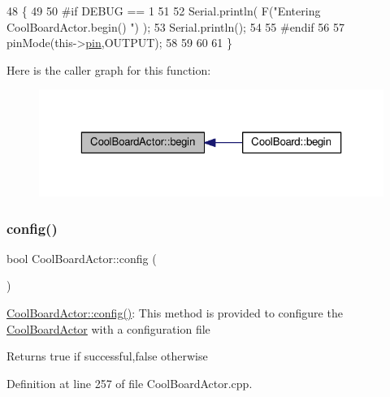 \begin{DoxyCode}
48 \{
49 
50 \textcolor{preprocessor}{#if DEBUG == 1 }
51  
52     Serial.println( F(\textcolor{stringliteral}{"Entering CoolBoardActor.begin() "}) );
53     Serial.println();
54 
55 \textcolor{preprocessor}{#endif}
56 
57     pinMode(this->\hyperlink{class_cool_board_actor_a8b5c0b41fe6033b68d9e1ed00bc2e122}{pin},OUTPUT);
58     
59     
60 
61 \}
\end{DoxyCode}
Here is the caller graph for this function\+:\nopagebreak
\begin{figure}[H]
\begin{center}
\leavevmode
\includegraphics[width=323pt]{dc/d69/class_cool_board_actor_a7f4422fd85a5510bc2cdfd68e109be5e_icgraph}
\end{center}
\end{figure}
\mbox{\label{class_cool_board_actor_a5af5538fc7d169f63127e06d5219bcd4}} 
\subsubsection{\texorpdfstring{config()}{config()}}
{\footnotesize\ttfamily bool Cool\+Board\+Actor\+::config (\begin{DoxyParamCaption}{ }\end{DoxyParamCaption})}

\hyperlink{class_cool_board_actor_a5af5538fc7d169f63127e06d5219bcd4}{Cool\+Board\+Actor\+::config()}\+: This method is provided to configure the \hyperlink{class_cool_board_actor}{Cool\+Board\+Actor} with a configuration file

\begin{DoxyReturn}{Returns}
true if successful,false otherwise 
\end{DoxyReturn}


Definition at line 257 of file Cool\+Board\+Actor.\+cpp.


